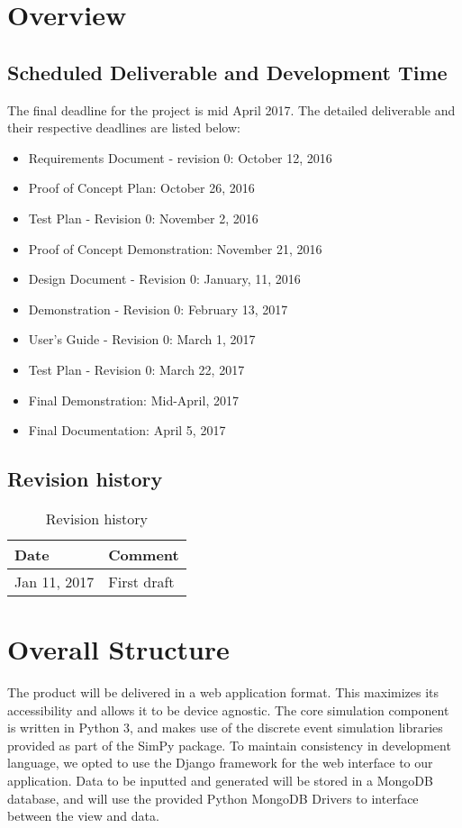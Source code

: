 \documentclass[12pt]{article}
\begin{document}
\section{Overview}

\subsection{Scheduled Deliverable and Development Time}
The final deadline for the project is mid April 2017. The detailed deliverable and their respective deadlines are listed below:
\begin{itemize}
  \item Requirements Document - revision 0: October 12, 2016 
  \item Proof of Concept Plan: October 26, 2016
  \item Test Plan - Revision 0: November 2, 2016
  \item Proof of Concept Demonstration: November 21, 2016
  \item Design Document - Revision 0: January, 11, 2016
  \item Demonstration - Revision 0: February 13, 2017
  \item User’s Guide - Revision 0: March 1, 2017
  \item Test Plan - Revision 0: March 22, 2017
  \item Final Demonstration: Mid-April, 2017
  \item Final Documentation: April 5, 2017
\end{itemize}

\subsection{Revision history}
\begin{table}[H]
\centering
\caption{Revision history}
\label{revision-history}
\begin{tabular}{|l|l|}
\toprule
Date         & Comment     \\ \hline
Jan 11, 2017 & First draft \\ \hline
\end{tabular}
\end{table}
\newpage



\section{Overall Structure}

The product will be delivered in a web application format. This maximizes its accessibility and allows it to be device agnostic. The core simulation component is written in Python 3, and makes use of the discrete event simulation libraries provided as part of the SimPy package. To maintain consistency in development language, we opted to use the Django framework for the web interface to our application. Data to be inputted and generated will be stored in a MongoDB database, and will use the provided Python MongoDB Drivers to interface between the view and data.
\end{document}
